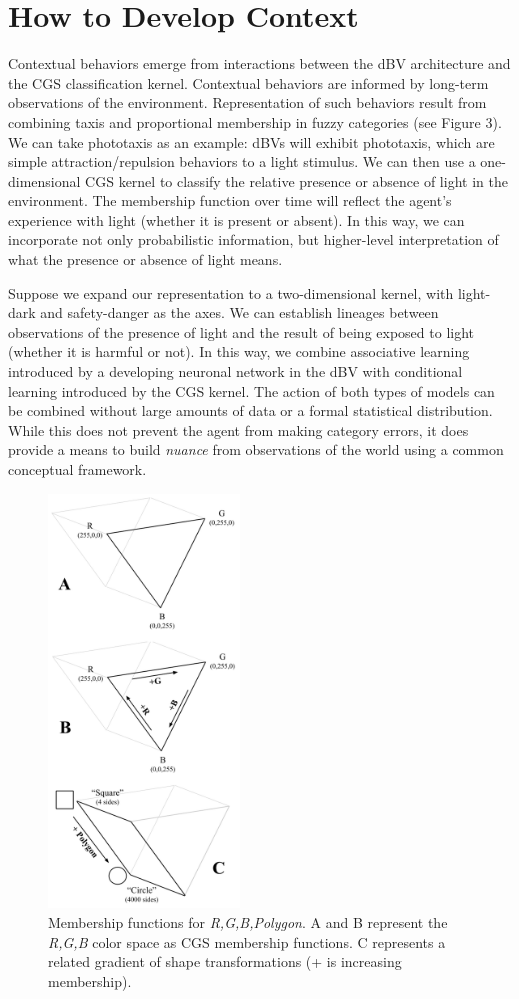 \documentclass[letterpaper]{article}
\begin{document}
\section{How to Develop Context}
Contextual behaviors emerge from interactions between the dBV architecture and the CGS classification kernel. Contextual behaviors are informed by long-term observations of the environment. Representation of such behaviors result from combining taxis and proportional membership in fuzzy categories (see Figure 3). We can take phototaxis as an example: dBVs will exhibit phototaxis, which are simple attraction/repulsion behaviors to a light stimulus. We can then use a one-dimensional CGS kernel to classify the relative presence or absence of light in the environment. The membership function over time will reflect the agent's experience with light (whether it is present or absent). In this way, we can incorporate not only probabilistic information, but higher-level interpretation of what the presence or absence of light means. 

Suppose we expand our representation to a two-dimensional kernel, with light-dark and safety-danger as the axes. We can establish lineages between observations of the presence of light and the result of being exposed to light (whether it is harmful or not). In this way, we combine associative learning introduced by a developing neuronal network in the dBV with conditional learning introduced by the CGS kernel. The action of both types of models can be combined without large amounts of data or a formal statistical distribution. While this does not prevent the agent from making category errors, it does provide a means to build \textit{nuance} from observations of the world using a common conceptual framework.

\begin{figure}[!htb]
\begin{center}
\includegraphics[width=2in]{Figure 3.png}
\caption{Membership functions for \textit{R,G,B,Polygon}. A and B represent the \textit{R,G,B} color space as CGS membership functions. C represents a related gradient of shape transformations (+ is increasing membership).}
\label{fig3}
\end{center}
\end{figure}
\end{document}
